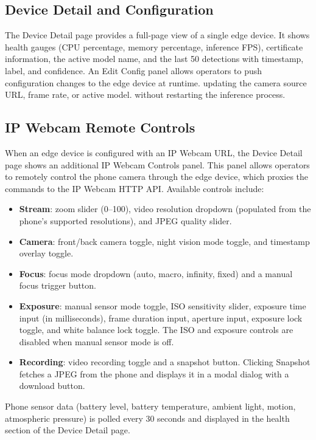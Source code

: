 \documentclass[12pt,a4paper]{report}
\begin{document}
\subsection{Device Detail and Configuration}

The Device Detail page provides a full-page view of a single edge device.
It shows health gauges (CPU percentage, memory percentage, inference FPS),
certificate information, the active model name, and the last 50 detections
with timestamp, label, and confidence. An Edit Config panel allows operators
to push configuration changes to the edge device at runtime. updating the
camera source URL, frame rate, or active model. without restarting the
inference process.

\subsection{IP Webcam Remote Controls}

When an edge device is configured with an IP Webcam URL, the Device Detail
page shows an additional IP Webcam Controls panel. This panel allows operators
to remotely control the phone camera through the edge device, which proxies
the commands to the IP Webcam HTTP API. Available controls include:

\begin{itemize}
  \item \textbf{Stream}: zoom slider (0--100), video resolution dropdown
        (populated from the phone's supported resolutions), and JPEG quality
        slider.
  \item \textbf{Camera}: front/back camera toggle, night vision mode
        toggle, and timestamp overlay toggle.
  \item \textbf{Focus}: focus mode dropdown (auto, macro, infinity, fixed)
        and a manual focus trigger button.
  \item \textbf{Exposure}: manual sensor mode toggle, ISO sensitivity slider,
        exposure time input (in milliseconds), frame duration input, aperture
        input, exposure lock toggle, and white balance lock toggle. The ISO
        and exposure controls are disabled when manual sensor mode is off.
  \item \textbf{Recording}: video recording toggle and a snapshot button.
        Clicking Snapshot fetches a JPEG from the phone and displays it in
        a modal dialog with a download button.
\end{itemize}

Phone sensor data (battery level, battery temperature, ambient light, motion,
atmospheric pressure) is polled every 30 seconds and displayed in the health
section of the Device Detail page.
\end{document}
